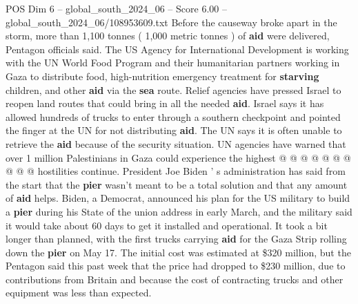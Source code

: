 \begin{textsample}{POS Dim 6 – global\_south\_2024\_06 – Score 6.00 – global\_south\_2024\_06/108953609.txt}
Before the causeway broke apart in the storm, more than 1,100 tonnes ( 1,000 metric tonnes ) of \textbf{aid} were delivered, Pentagon officials said.
The US Agency for International Development is working with the UN World Food Program and their humanitarian partners working in Gaza to distribute food, high-nutrition emergency treatment for \textbf{starving} children, and other \textbf{aid} via the \textbf{sea} route.
Relief agencies have pressed Israel to reopen land routes that could bring in all the needed \textbf{aid}.
Israel says it has allowed hundreds of trucks to enter through a southern checkpoint and pointed the finger at the UN for not distributing \textbf{aid}.
The UN says it is often unable to retrieve the \textbf{aid} because of the security situation.
UN agencies have warned that over 1 million Palestinians in Gaza could experience the highest @ @ @ @ @ @ @ @ @ @ hostilities continue.
President Joe Biden ' s administration has said from the start that the \textbf{pier} wasn't meant to be a total solution and that any amount of \textbf{aid} helps.
Biden, a Democrat, announced his plan for the US military to build a \textbf{pier} during his State of the union address in early March, and the military said it would take about 60 days to get it installed and operational.
It took a bit longer than planned, with the first trucks carrying \textbf{aid} for the Gaza Strip rolling down the \textbf{pier} on May 17.
The initial cost was estimated at \$320 million, but the Pentagon said this past week that the price had dropped to \$230 million, due to contributions from Britain and because the cost of contracting trucks and other equipment was less than expected.

\end{textsample}
